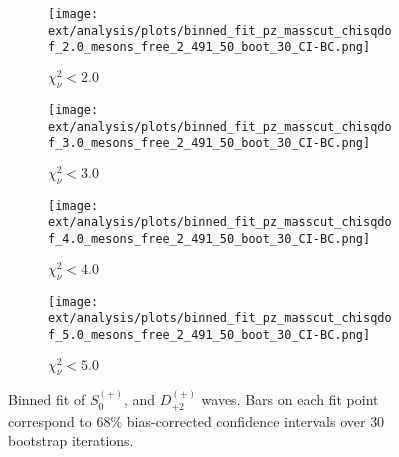 \begin{figure}[htbp]
    \centering
    \begin{subfigure}{0.45\textwidth}
        \texttt{[image: ext/analysis/plots/binned\_fit\_pz\_masscut\_chisqdof\_2.0\_mesons\_free\_2\_491\_50\_boot\_30\_CI-BC.png]}
        \caption{$\chi^2_\nu < 2.0$}
    \end{subfigure}
    \hfill
    \begin{subfigure}{0.45\textwidth}
        \texttt{[image: ext/analysis/plots/binned\_fit\_pz\_masscut\_chisqdof\_3.0\_mesons\_free\_2\_491\_50\_boot\_30\_CI-BC.png]}
        \caption{$\chi^2_\nu < 3.0$}
    \end{subfigure}
    \vspace{1em}
    \begin{subfigure}{0.45\textwidth}
        \texttt{[image: ext/analysis/plots/binned\_fit\_pz\_masscut\_chisqdof\_4.0\_mesons\_free\_2\_491\_50\_boot\_30\_CI-BC.png]}
        \caption{$\chi^2_\nu < 4.0$}
    \end{subfigure}
    \hfill
    \begin{subfigure}{0.45\textwidth}
        \texttt{[image: ext/analysis/plots/binned\_fit\_pz\_masscut\_chisqdof\_5.0\_mesons\_free\_2\_491\_50\_boot\_30\_CI-BC.png]}
        \caption{$\chi^2_\nu < 5.0$}
    \end{subfigure}

    \caption{Binned fit of $S_{0}^{(+)}$, and $D_{+2}^{(+)}$ waves. Bars on each fit point correspond to $68\%$ bias-corrected confidence intervals over $ 30 $ bootstrap iterations.}
    \label{fig:binned-fit-all-Sp-D2p}
\end{figure}

